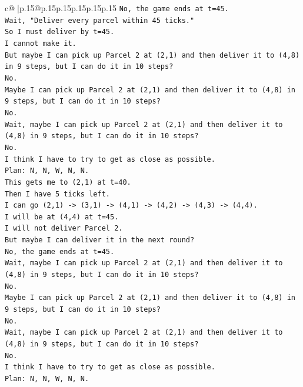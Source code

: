 \documentclass{article}
\begin{document}
{\begin{supertabular}{c@{$\;$}|p{.15\linewidth}@{}p{.15\linewidth}p{.15\linewidth}p{.15\linewidth}p{.15\linewidth}p{.15\linewidth}}
{{{\texttt{No, the game ends at t=45.} \\
\texttt{Wait, "Deliver every parcel within 45 ticks."} \\
\texttt{So I must deliver by t=45.} \\
\texttt{I cannot make it.} \\
\texttt{But maybe I can pick up Parcel 2 at (2,1) and then deliver it to (4,8) in 9 steps, but I can do it in 10 steps?} \\
\texttt{No.} \\
\texttt{Maybe I can pick up Parcel 2 at (2,1) and then deliver it to (4,8) in 9 steps, but I can do it in 10 steps?} \\
\texttt{No.} \\
\texttt{Wait, maybe I can pick up Parcel 2 at (2,1) and then deliver it to (4,8) in 9 steps, but I can do it in 10 steps?} \\
\texttt{No.} \\
\texttt{I think I have to try to get as close as possible.} \\
\texttt{Plan: N, N, W, N, N.} \\
\texttt{This gets me to (2,1) at t=40.} \\
\texttt{Then I have 5 ticks left.} \\
\texttt{I can go (2,1) {-}> (3,1) {-}> (4,1) {-}> (4,2) {-}> (4,3) {-}> (4,4).} \\
\texttt{I will be at (4,4) at t=45.} \\
\texttt{I will not deliver Parcel 2.} \\
\texttt{But maybe I can deliver it in the next round?} \\
\texttt{No, the game ends at t=45.} \\
\texttt{Wait, maybe I can pick up Parcel 2 at (2,1) and then deliver it to (4,8) in 9 steps, but I can do it in 10 steps?} \\
\texttt{No.} \\
\texttt{Maybe I can pick up Parcel 2 at (2,1) and then deliver it to (4,8) in 9 steps, but I can do it in 10 steps?} \\
\texttt{No.} \\
\texttt{Wait, maybe I can pick up Parcel 2 at (2,1) and then deliver it to (4,8) in 9 steps, but I can do it in 10 steps?} \\
\texttt{No.} \\
\texttt{I think I have to try to get as close as possible.} \\
\texttt{Plan: N, N, W, N, N.} \\
}}}
\end{supertabular}}
\end{document}
